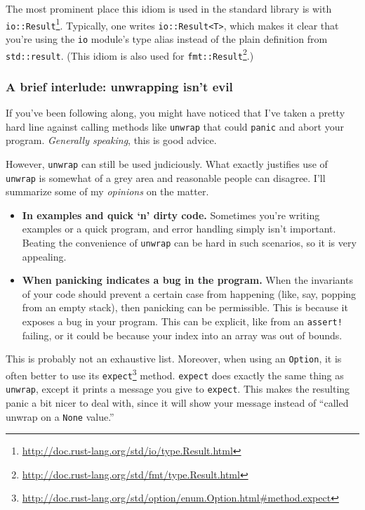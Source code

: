\documentclass[a4paper,]{book}
\renewcommand*{\hypertarget}[3][\ar]{%
  \def\ar{#2}%
  \label{#1}%
  #3}
\renewcommand{\href}[2]{#2\footnote{\url{#1}}}
\providecommand{\tightlist}{%
  \setlength{\itemsep}{0pt}\setlength{\parskip}{0pt}}
\begin{document}
The most prominent place this idiom is used in the standard library is
with
\href{http://doc.rust-lang.org/std/io/type.Result.html}{\texttt{io::Result}}.
Typically, one writes \texttt{io::Result\textless{}T\textgreater{}},
which makes it clear that you're using the \texttt{io} module's type
alias instead of the plain definition from \texttt{std::result}. (This
idiom is also used for
\href{http://doc.rust-lang.org/std/fmt/type.Result.html}{\texttt{fmt::Result}}.)

\hypertarget{a-brief-interlude-unwrapping-isnt-evil}{\subsubsection{A
brief interlude: unwrapping isn't
evil}\label{a-brief-interlude-unwrapping-isnt-evil}}

If you've been following along, you might have noticed that I've taken a
pretty hard line against calling methods like \texttt{unwrap} that could
\texttt{panic} and abort your program. \emph{Generally speaking}, this
is good advice.

However, \texttt{unwrap} can still be used judiciously. What exactly
justifies use of \texttt{unwrap} is somewhat of a grey area and
reasonable people can disagree. I'll summarize some of my
\emph{opinions} on the matter.

\begin{itemize}
\tightlist
\item
  \textbf{In examples and quick `n' dirty code.} Sometimes you're
  writing examples or a quick program, and error handling simply isn't
  important. Beating the convenience of \texttt{unwrap} can be hard in
  such scenarios, so it is very appealing.
\item
  \textbf{When panicking indicates a bug in the program.} When the
  invariants of your code should prevent a certain case from happening
  (like, say, popping from an empty stack), then panicking can be
  permissible. This is because it exposes a bug in your program. This
  can be explicit, like from an \texttt{assert!} failing, or it could be
  because your index into an array was out of bounds.
\end{itemize}

This is probably not an exhaustive list. Moreover, when using an
\texttt{Option}, it is often better to use its
\href{http://doc.rust-lang.org/std/option/enum.Option.html\#method.expect}{\texttt{expect}}
method. \texttt{expect} does exactly the same thing as \texttt{unwrap},
except it prints a message you give to \texttt{expect}. This makes the
resulting panic a bit nicer to deal with, since it will show your
message instead of ``called unwrap on a \texttt{None} value.''
\end{document}
